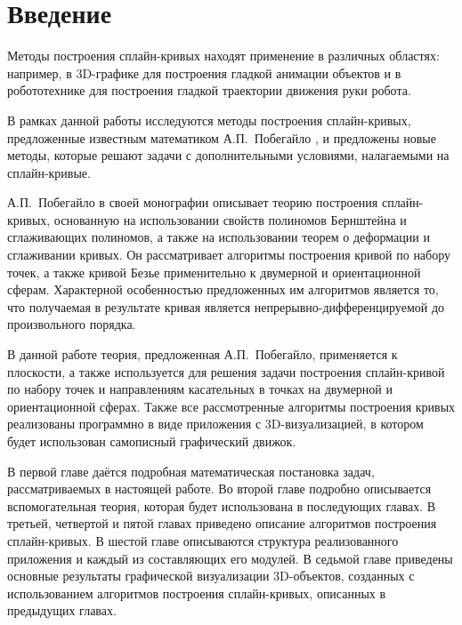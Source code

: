 \chapter*{Введение}

Методы построения сплайн-кривых находят применение в различных областях: например, в 3D-графике для построения гладкой
анимации объектов и в робототехнике для построения гладкой траектории движения руки робота.

В рамках данной работы исследуются методы построения сплайн-кривых, предложенные известным математиком
А.П.~Побегайло \cite{pobegaylo}, и предложены новые методы, которые решают задачи с дополнительными условиями,
налагаемыми на сплайн-кривые.

А.П.~Побегайло в своей монографии описывает теорию построения сплайн-кривых, основанную на
использовании свойств полиномов Бернштейна и сглаживающих полиномов, а также на использовании теорем о деформации и
сглаживании кривых. Он рассматривает алгоритмы построения кривой по набору точек, а также кривой Безье применительно
к двумерной и ориентационной сферам. Характерной особенностью предложенных им алгоритмов является то, что получаемая
в результате кривая является непрерывно-дифференцируемой до произвольного порядка.

В данной работе теория, предложенная А.П.~Побегайло, применяется к плоскости, а также используется для
решения задачи построения сплайн-кривой по набору точек и направлениям касательных в точках на двумерной и
ориентационной сферах. Также все рассмотренные алгоритмы построения кривых реализованы программно в виде
приложения с 3D-визуализацией, в котором будет использован самописный графический движок.

В первой главе даётся подробная математическая постановка задач, рассматриваемых в настоящей работе. Во второй главе
подробно описывается вспомогательная теория, которая будет использована в последующих главах. В третьей, четвертой и
пятой главах приведено описание алгоритмов построения сплайн-кривых. В шестой главе описываются структура
реализованного приложения и каждый из составляющих его модулей. В седьмой главе приведены основные результаты
графической визуализации 3D-объектов, созданных с использованием алгоритмов построения сплайн-кривых,
описанных в предыдущих главах.
